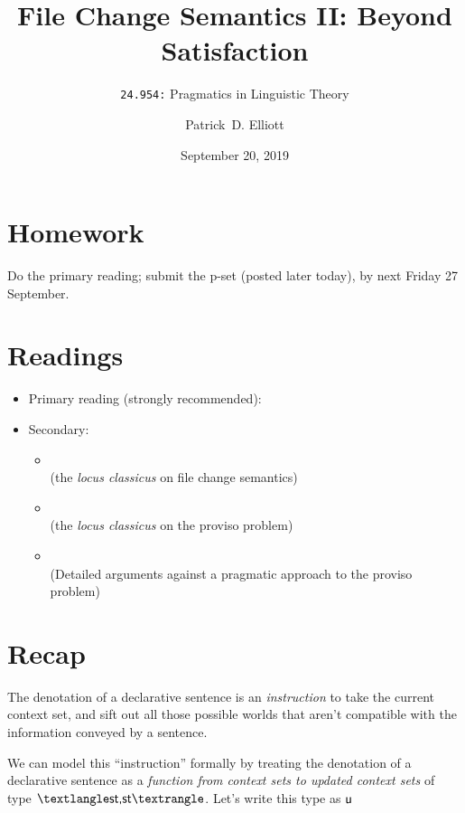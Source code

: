 \documentclass[cronos,landscape,paper=letter]{ling-handout}
\title{File Change Semantics II: Beyond Satisfaction}
\subtitle{\texttt{24.954:} Pragmatics in Linguistic Theory}
\date{September 20, 2019}
\author{Patrick~D. Elliott}
\begin{document}
\maketitle

\section*{Homework}

Do the primary reading; submit the p-set (posted later today), by next Friday 27 September.

\section*{Readings}

\begin{itemize}

    \item Primary reading (strongly recommended): 

    \item Secondary:

    \begin{itemize}

      \item {}\\
       (the \textit{locus classicus} on file change semantics)

      \item {}\\
        (the \textit{locus classicus} on the proviso problem)

      \item {}\\
        (Detailed arguments against a pragmatic approach to the proviso problem)

    \end{itemize}

\end{itemize}

\section*{Recap}

The denotation of a declarative sentence is an \textit{instruction} to take the current context set, and sift out all those possible worlds that aren't compatible with the information conveyed by a sentence.

We can model this \enquote{instruction} formally by treating the denotation of a declarative sentence as a \textit{function from context sets to updated context sets} of type \(⟨\ml{st,st}⟩\). Let's write this type as \(\textsf{u}\)
\end{document}
